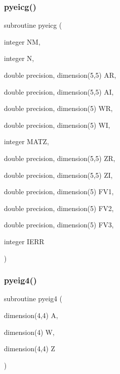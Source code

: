 \subsubsection{\texorpdfstring{pyeicg()}{pyeicg()}}
{\footnotesize\ttfamily subroutine pyeicg (\begin{DoxyParamCaption}\item[{integer}]{NM,  }\item[{integer}]{N,  }\item[{double precision, dimension(5,5)}]{AR,  }\item[{double precision, dimension(5,5)}]{AI,  }\item[{double precision, dimension(5)}]{WR,  }\item[{double precision, dimension(5)}]{WI,  }\item[{integer}]{M\+A\+TZ,  }\item[{double precision, dimension(5,5)}]{ZR,  }\item[{double precision, dimension(5,5)}]{ZI,  }\item[{double precision, dimension(5)}]{F\+V1,  }\item[{double precision, dimension(5)}]{F\+V2,  }\item[{double precision, dimension(5)}]{F\+V3,  }\item[{integer}]{I\+E\+RR }\end{DoxyParamCaption})}

\mbox{\label{pythia-6_84_824_8f_afebb24c57866a2c33d3fcd7dde0a92a9}} 
\subsubsection{\texorpdfstring{pyeig4()}{pyeig4()}}
{\footnotesize\ttfamily subroutine pyeig4 (\begin{DoxyParamCaption}\item[{dimension(4,4)}]{A,  }\item[{dimension(4)}]{W,  }\item[{dimension(4,4)}]{Z }\end{DoxyParamCaption})}

\mbox{\label{pythia-6_84_824_8f_a8a7efe2037220dc632000fb06895ebca}} 
